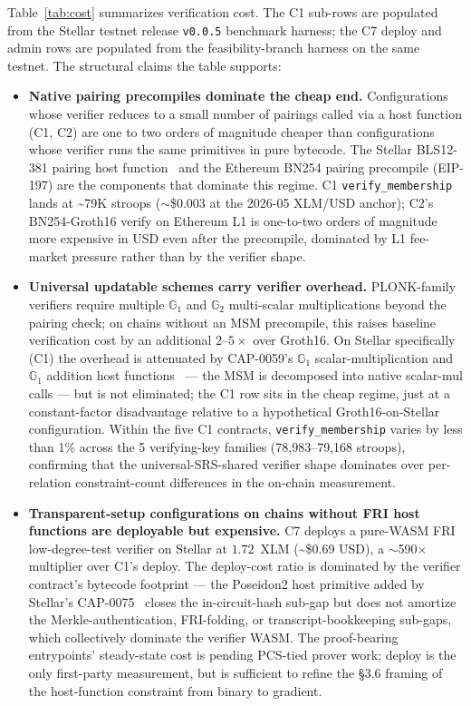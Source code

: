 Table~\ref{tab:cost} summarizes verification cost. The C1 sub-rows
are populated from the Stellar testnet release \texttt{v0.0.5}
benchmark harness; the C7 deploy and admin rows are populated from
the feasibility-branch harness on the same testnet. The structural
claims the table supports:

\begin{itemize}
  \item \textbf{Native pairing precompiles dominate the cheap end.}
    Configurations whose verifier reduces to a small number of
    pairings called via a host function (C1, C2) are one to two
    orders of magnitude cheaper than configurations whose verifier
    runs the same primitives in pure bytecode. The Stellar
    BLS12-381 pairing host function~\cite{stellar-cap-0059} and the
    Ethereum BN254 pairing precompile (EIP-197) are the components
    that dominate this regime. C1 \texttt{verify\_membership} lands
    at \textasciitilde 79K stroops ($\sim$\$0.003 at the 2026-05
    XLM/USD anchor); C2's BN254-Groth16 verify on Ethereum L1 is
    one-to-two orders of magnitude more expensive in USD even after
    the precompile, dominated by L1 fee-market pressure rather than
    by the verifier shape.
  \item \textbf{Universal updatable schemes carry verifier overhead.}
    PLONK-family verifiers require multiple $\mathbb{G}_1$ and
    $\mathbb{G}_2$ multi-scalar multiplications beyond the pairing
    check; on chains without an MSM precompile, this raises baseline
    verification cost by an additional $2$--$5\times$ over Groth16.
    On Stellar specifically (C1) the overhead is attenuated by
    CAP-0059's $\mathbb{G}_1$ scalar-multiplication and
    $\mathbb{G}_1$ addition host
    functions~\cite{stellar-cap-0059} --- the MSM is decomposed into
    native scalar-mul calls --- but is not eliminated; the C1 row
    sits in the cheap regime, just at a constant-factor disadvantage
    relative to a hypothetical Groth16-on-Stellar configuration.
    Within the five C1 contracts, \texttt{verify\_membership}
    varies by less than 1\% across the 5 verifying-key families
    (78,983--79,168 stroops), confirming that the
    universal-SRS-shared verifier shape dominates over per-relation
    constraint-count differences in the on-chain measurement.
  \item \textbf{Transparent-setup configurations on chains without
    FRI host functions are deployable but expensive.} C7 deploys a
    pure-WASM FRI low-degree-test verifier on Stellar at $1.72$~XLM
    (\textasciitilde\$0.69 USD), a $\sim$590$\times$ multiplier over
    C1's deploy. The deploy-cost ratio is dominated by the verifier
    contract's bytecode footprint --- the Poseidon2 host primitive
    added by Stellar's CAP-0075~\cite{stellar-cap-0075} closes the
    in-circuit-hash sub-gap but does not amortize the
    Merkle-authentication, FRI-folding, or transcript-bookkeeping
    sub-gaps, which collectively dominate the verifier WASM. The
    proof-bearing entrypoints' steady-state cost is pending PCS-tied
    prover work; deploy is the only first-party measurement, but is
    sufficient to refine the §3.6 framing of the
    host-function constraint from binary to gradient.
\end{itemize}

